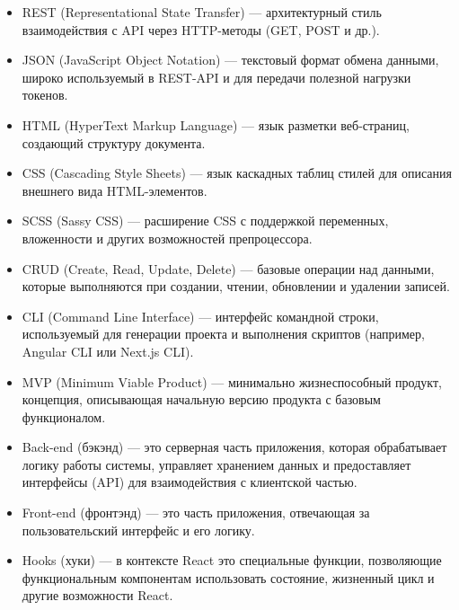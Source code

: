 \begin{itemize}
  \item REST (Representational State Transfer) — архитектурный стиль взаимодействия с API через HTTP-методы (GET, POST и др.).
  \item JSON (JavaScript Object Notation) — текстовый формат обмена данными, широко используемый в REST-API и для передачи полезной нагрузки токенов.
  \item HTML (HyperText Markup Language) — язык разметки веб-страниц, создающий структуру документа.
  \item CSS (Cascading Style Sheets) — язык каскадных таблиц стилей для описания внешнего вида HTML-элементов.
  \item SCSS (Sassy CSS) — расширение CSS с поддержкой переменных, вложенности и других возможностей препроцессора.
  \item CRUD (Create, Read, Update, Delete) — базовые операции над данными, которые выполняются при создании, чтении, обновлении и удалении записей.
  \item CLI (Command Line Interface) — интерфейс командной строки, используемый для генерации проекта и выполнения скриптов (например, Angular CLI или Next.js CLI).
  \item MVP (Minimum Viable Product) — минимально жизнеспособный продукт, концепция, описывающая начальную версию продукта с базовым функционалом.
  \item Back-end (бэкэнд) — это серверная часть приложения, которая обрабатывает логику работы системы, управляет хранением данных и предоставляет интерфейсы (API) для взаимодействия с клиентской частью.
  \item Front-end (фронтэнд) — это часть приложения, отвечающая за пользовательский интерфейс и его логику.
  \item Hooks (хуки) — в контексте React это специальные функции, позволяющие функциональным компонентам использовать состояние, жизненный цикл и другие возможности React.
\end{itemize}